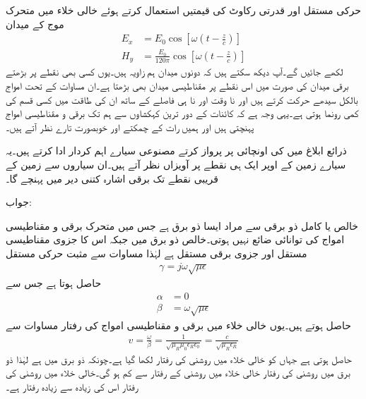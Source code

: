 حرکی مستقل اور قدرتی رکاوٹ کی قیمتیں استعمال کرتے ہوئے خالی خلاء میں متحرک موج کے میدان
\begin{align*}
E_x&=E_0 \cos \left[\omega \left( t -\frac{z}{c} \right)\right]\\
H_y&=\frac{E_0}{120 \pi} \cos \left[ \omega \left( t -\frac{z}{c} \right) \right]
\end{align*}
لکھے جائیں گے۔آپ دیکھ سکتے ہیں کہ دونوں میدان ہم زاویہ ہیں۔یوں کسی بھی نقطے پر بڑھتے برقی میدان کی صورت میں اس نقطے پر مقناطیسی میدان بھی بڑھتا ہے۔ان مساوات کے تحت امواج بالکل سیدھے حرکت کرتے ہیں اور نا وقت اور نا ہی فاصلے کے ساتھ ان کی طاقت میں کسی قسم کی کمی رونما ہوتی ہے۔یہی وجہ ہے کہ کائنات کے دور ترین کہکشاوں سے ہم تک برقی و مقناطیسی امواج پہنچتی ہیں اور ہمیں رات کے چمکتے اور خوبصورت تارے نظر آتے ہیں۔

 ذرائع ابلاغ میں  کی اونچائی پر پرواز کرتے مصنوعی سیارے اہم کردار ادا کرتے ہیں۔یہ سیارے زمین کے اوپر ایک ہی نقطے پر آویزاں نظر آتے ہیں۔ان سیاروں سے زمین کے قریبی نقطے تک برقی اشارہ کتنی دیر میں پہنچے گا۔

جواب:

خالص یا کامل ذو برقی سے مراد ایسا ذو برق ہے جس میں متحرک برقی و مقناطیسی امواج کی توانائی ضائع نہیں ہوتی۔خالص ذو برق میں  جبکہ اس کا جزوی مقناطیسی مستقل  اور جزوی برقی مستقل   ہے لہٰذا مساوات  سے مثبت حرکی مستقل
\begin{align*}
\gamma=j \omega \sqrt{\mu \epsilon }
\end{align*}
حاصل ہوتا ہے جس سے
\begin{align*}
\alpha&=0\\
\beta&=\omega \sqrt{\mu \epsilon}
\end{align*}
حاصل ہوتے ہیں۔یوں خالی خلاء میں برقی و مقناطیسی امواج کی رفتار  مساوات  سے
\begin{align}
v=\frac{\omega}{\beta}=\frac{1}{\sqrt{\mu_R \mu_0 \epsilon_R \epsilon_0}}=\frac{c}{\sqrt{\mu_R \epsilon_R}}
\end{align} 
حاصل ہوتی ہے جہاں  کو خالی خلاء میں روشنی کی رفتار  لکھا گیا ہے۔چونکہ ذو برق میں  ہے  لہٰذا ذو برق میں روشنی کی رفتار خالی خلاء میں روشنی کے رفتار سے کم ہو گی۔خالی خلاء میں روشنی کی رفتار اس کی زیادہ سے زیادہ رفتار ہے۔

